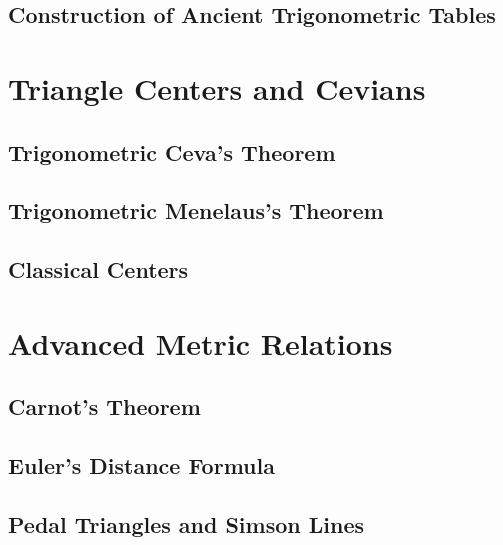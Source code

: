 \documentclass{article}
\theoremstyle{definition}
\theoremstyle{plain}
\begin{document}
\subsection{Construction of Ancient Trigonometric Tables}

\section{Triangle Centers and Cevians}

\subsection{Trigonometric Ceva's Theorem}

\subsection{Trigonometric Menelaus's Theorem}

\subsection{Classical Centers}

\section{Advanced Metric Relations}

\subsection{Carnot's Theorem}

\subsection{Euler's Distance Formula}

\subsection{Pedal Triangles and Simson Lines}
\end{document}
